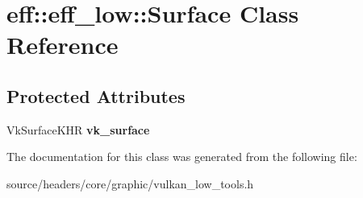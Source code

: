 \hypertarget{classeff_1_1eff__low_1_1Surface}{}\section{eff\+:\+:eff\+\_\+low\+:\+:Surface Class Reference}
\label{classeff_1_1eff__low_1_1Surface}
\subsection*{Protected Attributes}
\begin{DoxyCompactItemize}
\item 
\mbox{\label{classeff_1_1eff__low_1_1Surface_a818c10bc11c652de57f5b8c6cdb5089c}} 
Vk\+Surface\+K\+HR {\bfseries vk\+\_\+surface}
\end{DoxyCompactItemize}


The documentation for this class was generated from the following file\+:\begin{DoxyCompactItemize}
\item 
source/headers/core/graphic/vulkan\+\_\+low\+\_\+tools.\+h\end{DoxyCompactItemize}
